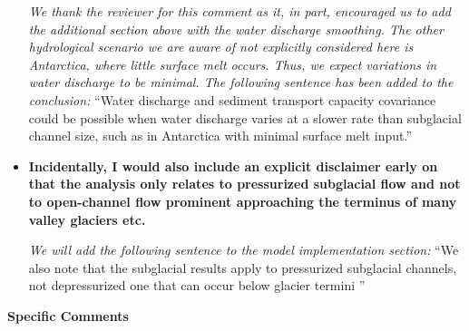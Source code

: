 \documentclass[11pt]{article}
\begin{document}
\begin{itemize}
  \textit{We thank the reviewer for this comment as it, in part, encouraged us to add the additional section above with the water discharge smoothing.
    The other hydrological scenario we are aware of not explicitly considered here is Antarctica, where little surface melt occurs.
    Thus, we expect variations in water discharge to be minimal.
    The following sentence has been added to the conclusion:}
    ``Water discharge and sediment transport capacity covariance could be possible when water discharge varies at a slower rate than subglacial channel size, such as in Antarctica with minimal surface melt input.''
    
\item   \textbf{
    Incidentally, I would also include an explicit disclaimer early on that the analysis only relates to
    pressurized subglacial flow and not to open-channel flow prominent approaching the terminus of
    many valley glaciers etc.}

   \textit{ We will add the following sentence to the model implementation section:}
``We also note that the subglacial results apply to pressurized subglacial channels, not depressurized one that can occur below glacier termini \citep{perolo2018}''
\end{itemize}

\textbf{Specific Comments}
\end{document}

